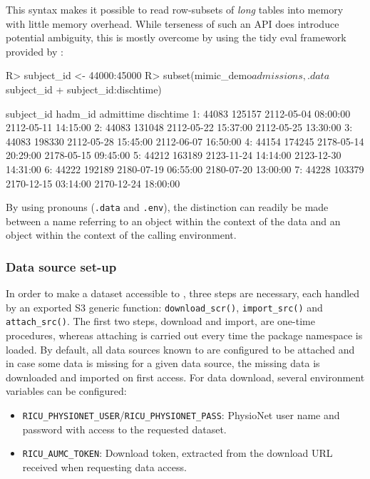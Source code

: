 \documentclass[
  notitle]{jss}
\providecommand{\tightlist}{%
  \setlength{\itemsep}{0pt}\setlength{\parskip}{0pt}}
\begin{document}
This syntax makes it possible to read row-subsets of \emph{long} tables
into memory with little memory overhead. While terseness of such an API
does introduce potential ambiguity, this is mostly overcome by using the
tidy eval framework provided by  \citep{wickham2020}:

\begin{CodeChunk}
\begin{CodeInput}
R> subject_id <- 44000:45000
R> subset(mimic_demo$admissions, .data$subject_id %
+        subject_id:dischtime)
\end{CodeInput}
\begin{CodeOutput}
   subject_id hadm_id           admittime           dischtime
1:      44083  125157 2112-05-04 08:00:00 2112-05-11 14:15:00
2:      44083  131048 2112-05-22 15:37:00 2112-05-25 13:30:00
3:      44083  198330 2112-05-28 15:45:00 2112-06-07 16:50:00
4:      44154  174245 2178-05-14 20:29:00 2178-05-15 09:45:00
5:      44212  163189 2123-11-24 14:14:00 2123-12-30 14:31:00
6:      44222  192189 2180-07-19 06:55:00 2180-07-20 13:00:00
7:      44228  103379 2170-12-15 03:14:00 2170-12-24 18:00:00
\end{CodeOutput}
\end{CodeChunk}

By using  pronouns (\texttt{.data} and \texttt{.env}), the
distinction can readily be made between a name referring to an object
within the context of the data and an object within the context of the
calling environment.

\hypertarget{data-source-set-up}{%
\subsubsection{Data source set-up}\label{data-source-set-up}}

In order to make a dataset accessible to , three steps are
necessary, each handled by an exported S3 generic function:
\texttt{download\_scr()}, \texttt{import\_src()} and
\texttt{attach\_src()}. The first two steps, download and import, are
one-time procedures, whereas attaching is carried out every time the
package namespace is loaded. By default, all data sources known to
 are configured to be attached and in case some data is
missing for a given data source, the missing data is downloaded and
imported on first access. For data download, several environment
variables can be configured:

\begin{itemize}
\tightlist
\item
  \texttt{RICU\_PHYSIONET\_USER}/\texttt{RICU\_PHYSIONET\_PASS}:
  PhysioNet user name and password with access to the requested dataset.
\item
  \texttt{RICU\_AUMC\_TOKEN}: Download token, extracted from the
  download URL received when requesting data access.
\end{itemize}
\end{document}
